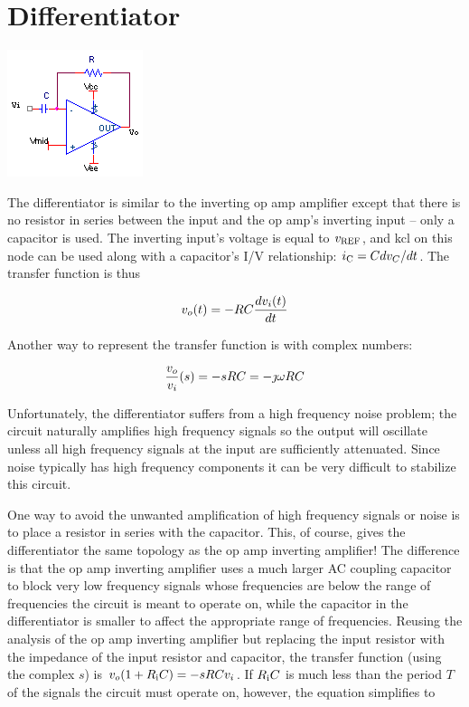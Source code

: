 \section{Differentiator}
\begin{center}
	\includegraphics{schematics/differentiator.PNG}
\end{center}
The differentiator is similar to the inverting op amp amplifier except that there is no resistor in series between the input and the op amp's inverting input -- only a capacitor is used.
The inverting input's voltage is equal to $v_\mathrm{REF}$, and \ac{kcl} on this node can be used along with a capacitor's I/V relationship: $i_\mathrm{C} = Cdv_C/dt$. The transfer function is thus

\textcolor{red}{
\begin{equation}
\vout(t) = -RC\frac{d\vin(t)}{dt}
\label{differentiator}
\end{equation}
}

\noindent Another way to represent the transfer function is with complex numbers:

\textcolor{red}{
\begin{equation}
\frac{\vout}{\vin}(s) = -sRC = -\jmath \omega RC
\label{eq:differentiator_complex}
\end{equation}
}

Unfortunately, the differentiator suffers from a high frequency noise problem; the circuit naturally amplifies high frequency signals so the output will oscillate unless all high frequency signals at the input are sufficiently attenuated.
Since noise typically has high frequency components it can be very difficult to stabilize this circuit.

One way to avoid the unwanted amplification of high frequency signals or noise is to place a resistor in series with the capacitor.
This, of course, gives the differentiator the same topology as the op amp inverting amplifier!
The difference is that the op amp inverting amplifier uses a much larger AC coupling capacitor to block very low frequency signals whose frequencies are below the range of frequencies the circuit is meant to operate on, while the capacitor in the differentiator is smaller to affect the appropriate range of frequencies.
Reusing the analysis of the op amp inverting amplifier but replacing the input resistor with the impedance of the input resistor and capacitor, the transfer function (using the complex $s$) is $\vout(1+R\sub{i}C) = -sRC\vin$. If $R_\mathrm{i} C$ is much less than the period $T$ of the signals the circuit must operate on, however, the equation simplifies to

